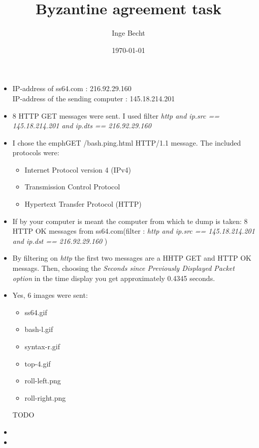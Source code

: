 \documentclass[12pt]{article} %
\begin{document}
\title{Byzantine agreement task}
\author{Inge Becht}
\date{\today}

\maketitle
 \begin{itemize}
     \item IP-address of ss64.com : 216.92.29.160\\
           IP-address of the sending computer : 145.18.214.201\\
    \item 8 HTTP GET messages were sent.
        I used filter \emph{http and ip.src == 145.18.214.201 and ip.dts ==
        216.92.29.160}\
    \item 
        I chose the emph{GET /bash.ping.html HTTP/1.1} message. The included
        protocols were:\\
        \begin{itemize}
            \item Internet Protocol version 4 (IPv4)
            \item Transmission Control Protocol
            \item Hypertext Transfer Protocol (HTTP)
        \end{itemize}
    \item If by your computer is meant the computer from which te dump is taken: 
        8 HTTP OK messages from ss64.com(filter : \emph{http and ip.src ==
        145.18.214.201 and ip.dst == 216.92.29.160} )
    \item{ By filtering on \emph{http} the first two messages are a HHTP GET and
            HTTP OK messags. Then, choosing the \emph{Seconds since Previously
            Displayed Packet option} in the time display you get approximately
            0.4345 seconds.
         }
    \item Yes, 6 images were sent:
        \begin{itemize}
            \item ss64.gif
            \item bash-l.gif
            \item syntax-r.gif
            \item top-4.gif
            \item roll-left.png
            \item roll-right.png
        \end{itemize}
    TODO\item 
    \item 

\end{itemize}
\end{document}
